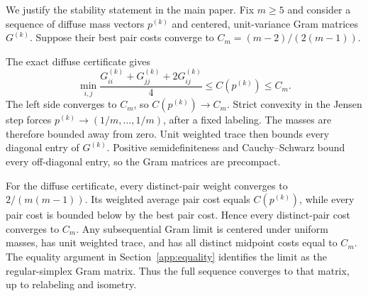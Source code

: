 \documentclass[twoside]{article}
\begin{document}
We justify the stability statement in the main paper. Fix $m\geq5$ and
consider a sequence of diffuse mass vectors $p^{(k)}$ and centered,
unit-variance Gram matrices $G^{(k)}$. Suppose their best pair costs converge
to $C_m=(m-2)/(2(m-1))$.

The exact diffuse certificate gives
\[
 \min_{i,j}\frac{G^{(k)}_{ii}+G^{(k)}_{jj}+2G^{(k)}_{ij}}4
 \leq C(p^{(k)})\leq C_m.
\]
The left side converges to $C_m$, so $C(p^{(k)})\to C_m$. Strict convexity in
the Jensen step forces $p^{(k)}\to(1/m,\ldots,1/m)$, after a fixed labeling.
The masses are therefore bounded away from zero. Unit weighted trace then
bounds every diagonal entry of $G^{(k)}$. Positive semidefiniteness and
Cauchy--Schwarz bound every off-diagonal entry, so the Gram matrices are
precompact.

For the diffuse certificate, every distinct-pair weight converges to
$2/(m(m-1))$. Its weighted average pair cost equals $C(p^{(k)})$, while every
pair cost is bounded below by the best pair cost. Hence every distinct-pair
cost converges to $C_m$. Any subsequential Gram limit is centered under
uniform masses, has unit weighted trace, and has all distinct midpoint costs
equal to $C_m$. The equality argument in Section~\ref{app:equality} identifies
the limit as the regular-simplex Gram matrix. Thus the full sequence converges
to that matrix, up to relabeling and isometry.
\end{document}
